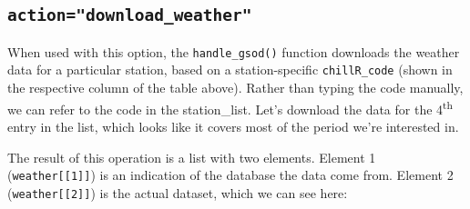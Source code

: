 \documentclass[
]{book}
\newenvironment{Shaded}{\begin{snugshade}}{\end{snugshade}}
\newcommand{\DataTypeTok}[1]{\textcolor[rgb]{0.13,0.29,0.53}{#1}}
\newcommand{\DecValTok}[1]{\textcolor[rgb]{0.00,0.00,0.81}{#1}}
\newcommand{\KeywordTok}[1]{\textcolor[rgb]{0.13,0.29,0.53}{\textbf{#1}}}
\newcommand{\NormalTok}[1]{#1}
\newcommand{\OperatorTok}[1]{\textcolor[rgb]{0.81,0.36,0.00}{\textbf{#1}}}
\newcommand{\StringTok}[1]{\textcolor[rgb]{0.31,0.60,0.02}{#1}}
\begin{document}
\hypertarget{actiondownload_weather}{%
\subsection{\texorpdfstring{\texttt{action="download\_weather"}}{action="download\_weather"}}\label{actiondownload_weather}}

When used with this option, the \texttt{handle\_gsod()} function downloads the weather data for a particular station, based on a station-specific \texttt{chillR\_code} (shown in the respective column of the table above). Rather than typing the code manually, we can refer to the code in the station\_list. Let's download the data for the 4\textsuperscript{th} entry in the list, which looks like it covers most of the period we're interested in.

\begin{Shaded}
\end{Shaded}

The result of this operation is a list with two elements. Element 1 (\texttt{weather{[}{[}1{]}{]}}) is an indication of the database the data come from. Element 2 (\texttt{weather{[}{[}2{]}{]}}) is the actual dataset, which we can see here:

\begin{Shaded}
\end{Shaded}

\begingroup\fontsize{8}{10}\selectfont
\end{document}
